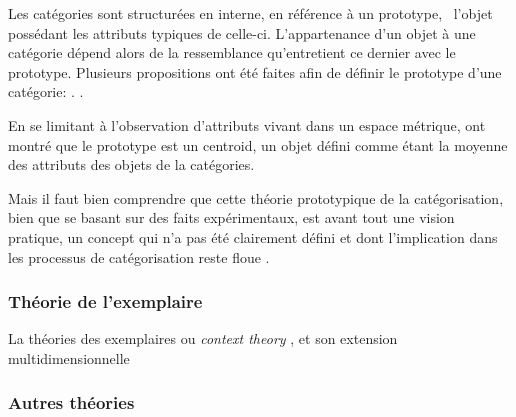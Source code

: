 Les catégories sont structurées en interne, en référence à un prototype, \ie~l'objet possédant les attributs typiques de celle-ci. L'appartenance d'un objet à une catégorie dépend alors de la ressemblance qu'entretient ce dernier avec le prototype.  Plusieurs propositions ont été faites afin de définir le prototype d'une catégorie:  . 
. 

En se limitant à l'observation d'attributs vivant dans un espace métrique, \citep{reed1972pattern, rosch1976structural} ont montré que le prototype est un centroid, un objet défini comme étant la moyenne des attributs des objets de la catégories.

Mais il faut bien comprendre que cette théorie prototypique de la catégorisation, bien que se basant sur des faits expérimentaux, est avant tout une vision pratique, un concept qui n'a pas été clairement défini et dont l'implication dans les processus de catégorisation reste floue \citep[p. 36-40]{rosch1978cognition} \citep[p. 49-54]{dubois1991semantique}.

\subsubsection{Théorie de l'exemplaire}

La théories des exemplaires ou \textit{context theory} \citep{medin1978context}, et son extension multidimensionnelle \citep{medin1978context}

\subsubsection{Autres théories}

